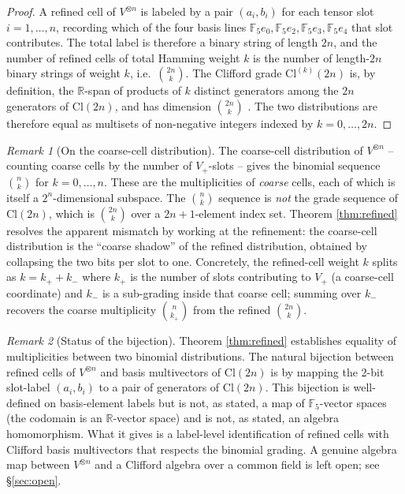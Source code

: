 \documentclass[11pt,reqno]{amsart}
\theoremstyle{plain}
\theoremstyle{definition}
\theoremstyle{remark}
\newtheorem*{remark}{Remark}
\newcommand{\F}{\mathbb{F}}
\newcommand{\R}{\mathbb{R}}
\newcommand{\Cl}{\mathrm{Cl}}
\begin{document}
\begin{proof}
A refined cell of $V^{\otimes n}$ is labeled by a pair $(a_i, b_i)$
for each tensor slot $i = 1, \ldots, n$, recording which of the four
basis lines $\F_5 e_0, \F_5 e_2, \F_5 e_3, \F_5 e_4$ that slot
contributes.  The total label is therefore a binary string of length
$2n$, and the number of refined cells of total Hamming weight $k$ is
the number of length-$2n$ binary strings of weight $k$, i.e.\
$\binom{2n}{k}$.
The Clifford grade $\Cl^{(k)}(2n)$ is, by definition, the
$\R$-span of products of $k$ distinct generators among the $2n$
generators of $\Cl(2n)$, and has dimension $\binom{2n}{k}$
\cite[Ch.~I]{HesteneSobczyk1984}.
The two distributions are therefore equal as multisets of
non-negative integers indexed by $k = 0, \ldots, 2n$.
\end{proof}

\begin{remark}[On the coarse-cell distribution]
\label{rem:coarse}
The coarse-cell distribution of $V^{\otimes n}$ -- counting coarse
cells by the number of $V_+$-slots -- gives the binomial sequence
$\binom{n}{k}$ for $k = 0, \ldots, n$.  These are the multiplicities
of \emph{coarse} cells, each of which is itself a $2^n$-dimensional
subspace.  The $\binom{n}{k}$ sequence is \emph{not} the grade
sequence of $\Cl(2n)$, which is $\binom{2n}{k}$ over a $2n+1$-element
index set.  Theorem \ref{thm:refined} resolves the apparent mismatch
by working at the refinement: the coarse-cell distribution is the
``coarse shadow'' of the refined distribution, obtained by collapsing
the two bits per slot to one.  Concretely, the refined-cell weight $k$
splits as $k = k_+ + k_-$ where $k_+$ is the number of slots
contributing to $V_+$ (a coarse-cell coordinate) and $k_-$ is a
sub-grading inside that coarse cell; summing over $k_-$ recovers the
coarse multiplicity $\binom{n}{k_+}$ from the refined $\binom{2n}{k}$.
\end{remark}

\begin{remark}[Status of the bijection]\label{rem:bijection}
Theorem \ref{thm:refined} establishes equality of multiplicities
between two binomial distributions.  The natural bijection between
refined cells of $V^{\otimes n}$ and basis multivectors of $\Cl(2n)$
is by mapping the 2-bit slot-label $(a_i, b_i)$ to a pair of generators
of $\Cl(2n)$.  This bijection is well-defined on basis-element labels
but is not, as stated, a map of $\F_5$-vector spaces (the codomain is
an $\R$-vector space) and is not, as stated, an algebra homomorphism.
What it gives is a label-level identification of refined cells with
Clifford basis multivectors that respects the binomial grading.
A genuine algebra map between $V^{\otimes n}$ and a Clifford algebra
over a common field is left open; see \S\ref{sec:open}.
\end{remark}
\end{document}
